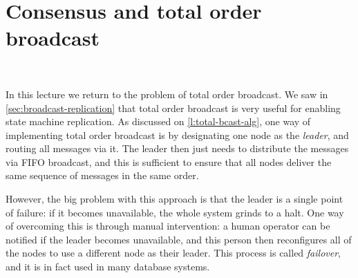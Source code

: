 {
}

\section{Consensus and total order broadcast}\label{sec:consensus}

\begin{frame}
    \begin{center}
        {\Large{\color{tumblue}{Consensus and total order broadcast}}} \\[2em]
        \mydetails
    \end{center}
\end{frame}

In this lecture we return to the problem of total order broadcast.
We saw in \autoref{sec:broadcast-replication} that total order broadcast is very useful for enabling state machine replication.
As discussed on \autoref{l:total-bcast-alg}, one way of implementing total order broadcast is by designating one node as the \emph{leader}, and routing all messages via it.
The leader then just needs to distribute the messages via FIFO broadcast, and this is sufficient to ensure that all nodes deliver the same sequence of messages in the same order.

However, the big problem with this approach is that the leader is a single point of failure: if it becomes unavailable, the whole system grinds to a halt.
One way of overcoming this is through manual intervention: a human operator can be notified if the leader becomes unavailable, and this person then reconfigures all of the nodes to use a different node as their leader.
This process is called \emph{failover}, and it is in fact used in many database systems.

